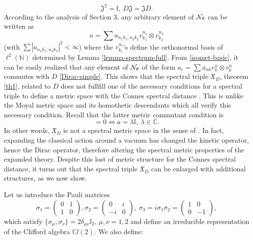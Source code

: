 \documentclass[a4paper]{jpconf}
\numberwithin{equation}{section}
\newcommand\bbone{{ \mathbb{I}}}
\theoremstyle{nonumberplain}
\begin{document}
\begin{equation}
\mathfrak{J}^2=\bbone,\ D\mathfrak{J}=\mathfrak{J}D\label{commut-1}. 
\end{equation}
According to the analysis of Section 3, any arbitrary element of ${\cal{N}}_\theta$ can be written as 
\begin{equation}
a=\sum a_{n_1k_1;n_2k_2}v^{n_1}_{k_1}\otimes v^{n_2}_{k_2}
\end{equation}
(with $\sum |a_{n_1k_1;n_2k_2} |^2<\infty$) where the $v^{n_i}_{k_i}$'s define the orthonormal basis of $\ell^2(\mathbb{N})$ determined by Lemma \ref{lemma-spectrum-full}. From \eqref{isomet-basic}, it can be easily realized that any element of ${\cal{N}}_\theta$ of the form $a_c=\sum a_{nk}v^n_k\otimes v^n_k$ commutes with $D$ \eqref{Dirac-simple}. This shows that the spectral triple $\mathfrak{X}_D$, theorem \ref{th1}, related to $D$ does not fullfill one of the necessary conditions for a spectral triple to define a metric space with the Connes spectral distance \cite{Rieffel}. This is unlike the Moyal metric space and its homothetic descendants which all verify this necessary condition. Recall that the latter metric commutant condition is 
\begin{equation}
[D,\eta(a)]=0\iff a=\lambda\bbone,\ \lambda\in\mathbb{C}. 
\end{equation}
In other words, $\mathfrak{X}_D$ is not a spectral metric space in the sense of \cite{homot-moyal,bel-mar}. In fact, expanding the classical action around a vacuum has changed the kinetic operator, hence the Dirac operator, therefore altering the spectral metric properties of the expanded theory. Despite this lost of metric structure for the Connes spectral distance, it turns out that the spectral triple $\mathfrak{X}_D$ can be enlarged with additional structures, as we now show.\par
Let us introduce the Pauli matrices
\begin{equation}
\sigma_1=\begin{pmatrix}
0&1\\ 
1&0
\end{pmatrix}, \sigma_2=\begin{pmatrix}
0&i\\ 
-i&0
\end{pmatrix},\ \sigma_3=i\sigma_1\sigma_2=\begin{pmatrix}
1&0\\
0&-1\end{pmatrix},
\end{equation}
which satisfy $\{\sigma_\mu,\sigma_\nu\}=2\delta_{\mu\nu}\bbone_2$, $\mu,\nu=1,2$ and define an irreducible representation of the Clifford algebra $\mathbb{C}l(2)$. We also define:
\end{document}
